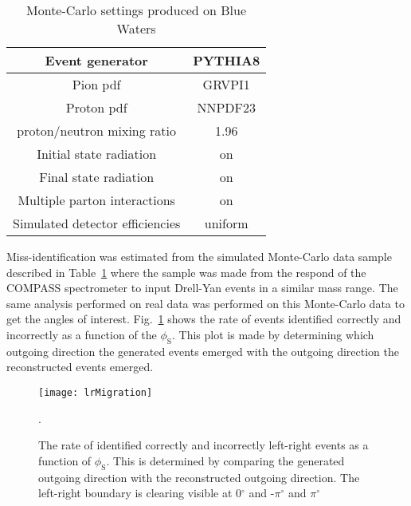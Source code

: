 \begin{table}[h!t]
  \centering
  \label{tab::MCproduction}
  \caption{Monte-Carlo settings produced on Blue Waters}
  \begin{tabular}{ |c|c| }
    \hline
    Event generator& PYTHIA8\\
    \hline

    Pion pdf& GRVPI1\\
    \hline

    Proton pdf& NNPDF23\\
    \hline
    
    proton/neutron mixing ratio& 1.96\\
    \hline

    Initial state radiation& on\\
    \hline
    
    Final state radiation& on\\
    \hline
    
    Multiple parton interactions& on\\
    \hline

    Simulated detector efficiencies& uniform\\
    \hline
    
  \end{tabular}
\end{table}

Miss-identification was estimated from the simulated Monte-Carlo data sample
described in Table~\ref{tab::MCproduction} where the sample was made from the
respond of the COMPASS spectrometer to input Drell-Yan events in a similar mass
range.  The same analysis performed on real data was performed on this
Monte-Carlo data to get the angles of interest.  Fig.~\ref{fig::lrMigration}
shows the rate of events identified correctly and incorrectly as a function of
the $\phi_{\mathrm{S}}$.  This plot is made by determining which outgoing
direction the generated events emerged with the outgoing direction the
reconstructed events emerged.

\begin{figure}[h!t]
  \centering
  \texttt{[image: lrMigration]}
  \caption{The rate of identified correctly and incorrectly left-right events as
    a function of $\phi_{\mathrm{S}}$.  This is determined by comparing the
    generated outgoing direction with the reconstructed outgoing direction.  The
    left-right boundary is clearing visible at 0$^{\circ}$ and -$\pi^{\circ}$
    and $\pi^{\circ}$}.
  \label{fig::lrMigration}
\end{figure}

